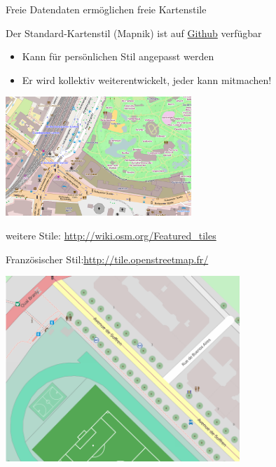 \documentclass{beamer}
\begin{document}
\begin{frame}{Freie Datendaten ermöglichen freie Kartenstile}

Der Standard-Kartenstil (Mapnik) ist auf \href{https://github.com/gravitystorm/openstreetmap-carto/}{Github} verfügbar
\begin{itemize}
  \item Kann für persönlichen Stil angepasst werden
  \item Er wird kollektiv weiterentwickelt, jeder kann mitmachen!
\end{itemize}

\begin{center}
\includegraphics[width=7cm]{style-mapnik.png}
\end{center}

\vspace{-0.5cm}
weitere Stile: \url{http://wiki.osm.org/Featured\_tiles}

\end{frame}

\hypersetup{urlcolor=cyan}

\begin{frame}{Französischer Stil:\hfill\url{http://tile.openstreetmap.fr/}}
\begin{center}
\includegraphics[height=7cm]{style-french.png}
\end{center}
\end{frame}
\end{document}
